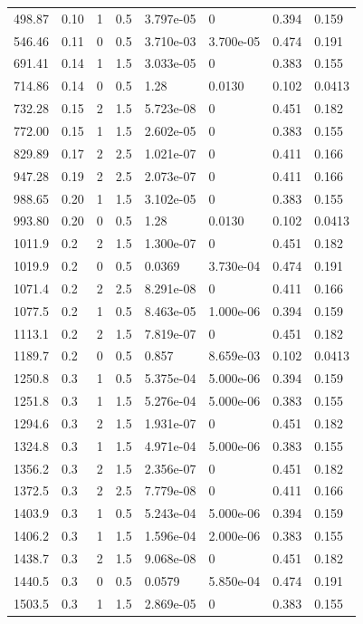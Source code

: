 \documentclass[preview]{standalone}
\begin{document}
{{\begin{tabular}{L{1.2cm}C{1.2cm} C{0.3cm}C{0.5cm} C{1.4cm}C{1.4cm} C{1.4cm}C{1.4cm}}
  498.87  &  0.10  & 1     & 0.5 &  3.797e-05  & 0  & 0.394 &  0.159   \\ 
  546.46  &  0.11  & 0     & 0.5 &  3.710e-03  & 3.700e-05  & 0.474 &  0.191   \\ 
  691.41  &  0.14  & 1     & 1.5 &  3.033e-05  & 0  & 0.383 &  0.155   \\ 
  714.86  &  0.14  & 0     & 0.5 &  1.28  & 0.0130  & 0.102 &  0.0413   \\ 
  732.28  &  0.15  & 2     & 1.5 &  5.723e-08  & 0  & 0.451 &  0.182   \\ 
  772.00  &  0.15  & 1     & 1.5 &  2.602e-05  & 0  & 0.383 &  0.155   \\ 
  829.89  &  0.17  & 2     & 2.5 &  1.021e-07  & 0  & 0.411 &  0.166   \\ 
  947.28  &  0.19  & 2     & 2.5 &  2.073e-07  & 0  & 0.411 &  0.166   \\ 
  988.65  &  0.20  & 1     & 1.5 &  3.102e-05  & 0  & 0.383 &  0.155   \\ 
  993.80  &  0.20  & 0     & 0.5 &  1.28  & 0.0130  & 0.102 &  0.0413   \\ 
  1011.9  &   0.2  & 2     & 1.5 &  1.300e-07  & 0  & 0.451 &  0.182   \\ 
  1019.9  &   0.2  & 0     & 0.5 &  0.0369  & 3.730e-04  & 0.474 &  0.191   \\ 
  1071.4  &   0.2  & 2     & 2.5 &  8.291e-08  & 0  & 0.411 &  0.166   \\ 
  1077.5  &   0.2  & 1     & 0.5 &  8.463e-05  & 1.000e-06  & 0.394 &  0.159   \\ 
  1113.1  &   0.2  & 2     & 1.5 &  7.819e-07  & 0  & 0.451 &  0.182   \\ 
  1189.7  &   0.2  & 0     & 0.5 &  0.857  & 8.659e-03  & 0.102 &  0.0413   \\ 
  1250.8  &   0.3  & 1     & 0.5 &  5.375e-04  & 5.000e-06  & 0.394 &  0.159   \\ 
  1251.8  &   0.3  & 1     & 1.5 &  5.276e-04  & 5.000e-06  & 0.383 &  0.155   \\ 
  1294.6  &   0.3  & 2     & 1.5 &  1.931e-07  & 0  & 0.451 &  0.182   \\ 
  1324.8  &   0.3  & 1     & 1.5 &  4.971e-04  & 5.000e-06  & 0.383 &  0.155   \\ 
  1356.2  &   0.3  & 2     & 1.5 &  2.356e-07  & 0  & 0.451 &  0.182   \\ 
  1372.5  &   0.3  & 2     & 2.5 &  7.779e-08  & 0  & 0.411 &  0.166   \\ 
  1403.9  &   0.3  & 1     & 0.5 &  5.243e-04  & 5.000e-06  & 0.394 &  0.159   \\ 
  1406.2  &   0.3  & 1     & 1.5 &  1.596e-04  & 2.000e-06  & 0.383 &  0.155   \\ 
  1438.7  &   0.3  & 2     & 1.5 &  9.068e-08  & 0  & 0.451 &  0.182   \\ 
  1440.5  &   0.3  & 0     & 0.5 &  0.0579  & 5.850e-04  & 0.474 &  0.191   \\ 
  1503.5  &   0.3  & 1     & 1.5 &  2.869e-05  & 0  & 0.383 &  0.155   \\ 
\hline 
\end{tabular} 

}}
\end{document}
